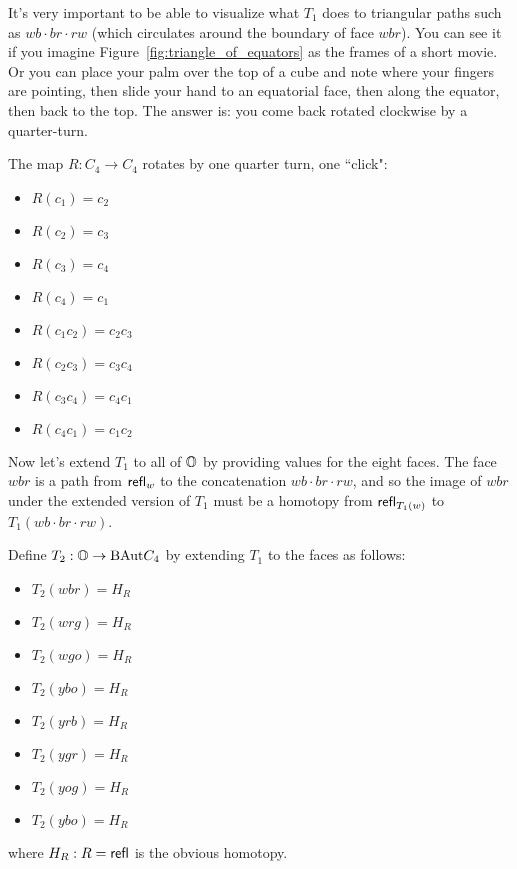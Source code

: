 It's very important to be able to visualize what \( T_1 \) does to triangular paths such as \( wb\cdot br\cdot rw \) (which circulates around the boundary of face \( wbr \)). You can see it if you imagine Figure~\ref{fig:triangle_of_equators} as the frames of a short movie. Or you can place your palm over the top of a cube and note where your fingers are pointing, then slide your hand to an equatorial face, then along the equator, then back to the top. The answer is: you come back rotated clockwise by a quarter-turn. 

\begin{mydef}
The map \( R:C_4\to C_4 \) rotates by one quarter turn, one ``click":
\begin{itemize}
\item \( R(c_1) = c_2 \)
\item \( R(c_2) = c_3 \)
\item \( R(c_3) = c_4 \)
\item \( R(c_4) = c_1 \)
\item \( R(c_1c_2) = c_2c_3 \)
\item \( R(c_2c_3) = c_3c_4 \)
\item \( R(c_3c_4) = c_4c_1 \)
\item \( R(c_4c_1) = c_1c_2 \)
\end{itemize}
\end{mydef}

Now let's extend \( T_1 \) to all of \( \mathbb{O} \) by providing values for the eight faces. The face \( wbr \) is a path from \( \mathsf{refl}_w \) to the concatenation \( wb\cdot br\cdot rw \), and so the image of \( wbr \) under the extended version of \( T_1 \) must be a homotopy from \( \mathsf{refl}_{T_1(w)} \) to \( T_1(wb\cdot br\cdot rw) \).

\begin{mydef}
Define \( T_2:\mathbb{O}\to\mathrm{BAut} C_4 \) by extending \( T_1 \) to the faces as follows:
\begin{itemize}
\item \( T_2(wbr)=H_R \) 
\item \( T_2(wrg)=H_R \)
\item \( T_2(wgo)=H_R \)
\item \( T_2(ybo)=H_R \)
\item \( T_2(yrb)=H_R \) 
\item \( T_2(ygr)=H_R \)
\item \( T_2(yog)=H_R \)
\item \( T_2(ybo)=H_R \)
\end{itemize}
where \( H_R:R=\mathsf{refl} \) is the obvious homotopy.
\end{mydef}

